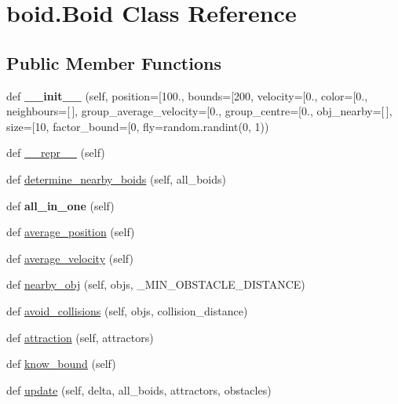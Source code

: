 \hypertarget{classboid_1_1Boid}{}\section{boid.\+Boid Class Reference}
\label{classboid_1_1Boid}
\subsection*{Public Member Functions}
\begin{DoxyCompactItemize}
\item 
\mbox{\label{classboid_1_1Boid_a79d14a195f383c4132c2dc49f3bb25d7}} 
def {\bfseries \+\_\+\+\_\+init\+\_\+\+\_\+} (self, position=\mbox{[}100., bounds=\mbox{[}200, velocity=\mbox{[}0., color=\mbox{[}0., neighbours=\mbox{[}$\,$\mbox{]}, group\+\_\+average\+\_\+velocity=\mbox{[}0., group\+\_\+centre=\mbox{[}0., obj\+\_\+nearby=\mbox{[}$\,$\mbox{]}, size=\mbox{[}10, factor\+\_\+bound=\mbox{[}0, fly=random.\+randint(0, 1))
\item 
def \hyperlink{classboid_1_1Boid_ab119eb2dfe1a5b2843929992af496051}{\+\_\+\+\_\+repr\+\_\+\+\_\+} (self)
\item 
def \hyperlink{classboid_1_1Boid_af50918fec659eb35307d69253ae89fe0}{determine\+\_\+nearby\+\_\+boids} (self, all\+\_\+boids)
\item 
\mbox{\label{classboid_1_1Boid_a710bcaf3ada5f6075b724eea7a8f2f3f}} 
def {\bfseries all\+\_\+in\+\_\+one} (self)
\item 
def \hyperlink{classboid_1_1Boid_af194aa87a6828aa7582431fdf074627b}{average\+\_\+position} (self)
\item 
def \hyperlink{classboid_1_1Boid_af3bebad17918fa7e106e50cc6f300209}{average\+\_\+velocity} (self)
\item 
def \hyperlink{classboid_1_1Boid_a4bf32244bda6419e04158e1b724b9b7e}{nearby\+\_\+obj} (self, objs, \+\_\+\+M\+I\+N\+\_\+\+O\+B\+S\+T\+A\+C\+L\+E\+\_\+\+D\+I\+S\+T\+A\+N\+CE)
\item 
def \hyperlink{classboid_1_1Boid_a5abaa756b7a6faf040d06f5c9a2f5dff}{avoid\+\_\+collisions} (self, objs, collision\+\_\+distance)
\item 
def \hyperlink{classboid_1_1Boid_a6e4936558af1adad15340cf6ad4be290}{attraction} (self, attractors)
\item 
def \hyperlink{classboid_1_1Boid_aa9dc9d7da55ba1d25a58b71bb44f6c66}{know\+\_\+bound} (self)
\item 
def \hyperlink{classboid_1_1Boid_a8785ce00989f8a785bac850dc2455471}{update} (self, delta, all\+\_\+boids, attractors, obstacles)
\end{DoxyCompactItemize}
